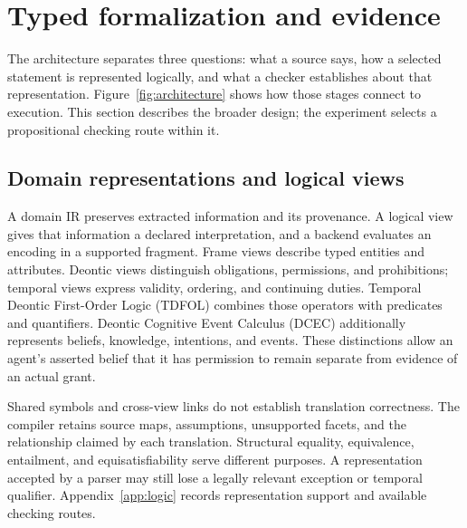 \section{Typed formalization and evidence}
\label{sec:formalization}

The architecture separates three questions: what a source says, how a selected statement is represented logically, and what a checker establishes about that representation. Figure~\ref{fig:architecture} shows how those stages connect to execution. This section describes the broader design; the experiment selects a propositional checking route within it.

\subsection{Domain representations and logical views}

A domain IR preserves extracted information and its provenance. A logical view gives that information a declared interpretation, and a backend evaluates an encoding in a supported fragment. Frame views describe typed entities and attributes. Deontic views distinguish obligations, permissions, and prohibitions; temporal views express validity, ordering, and continuing duties. Temporal Deontic First-Order Logic (TDFOL) combines those operators with predicates and quantifiers. Deontic Cognitive Event Calculus (DCEC) additionally represents beliefs, knowledge, intentions, and events. These distinctions allow an agent's asserted belief that it has permission to remain separate from evidence of an actual grant.

Shared symbols and cross-view links do not establish translation correctness. The compiler retains source maps, assumptions, unsupported facets, and the relationship claimed by each translation. Structural equality, equivalence, entailment, and equisatisfiability serve different purposes. A representation accepted by a parser may still lose a legally relevant exception or temporal qualifier. Appendix~\ref{app:logic} records representation support and available checking routes.

